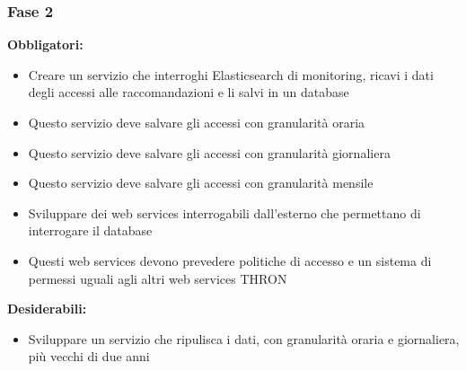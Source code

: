 \documentclass[a4paper, 12pt, twoside, openright]{book}
\begin{document}
\subsubsection{Fase 2}
\textbf{Obbligatori:}
\begin{itemize}
\item Creare un servizio che interroghi Elasticsearch di monitoring, ricavi i dati degli accessi alle raccomandazioni e li salvi in un database
\item Questo servizio deve salvare gli accessi con granularità oraria
\item Questo servizio deve salvare gli accessi con granularità giornaliera
\item Questo servizio deve salvare gli accessi con granularità mensile
\item Sviluppare dei web services interrogabili dall'esterno che permettano di interrogare il database
\item Questi web services devono prevedere politiche di accesso e un sistema di permessi uguali agli altri web services THRON
\end{itemize}
\textbf{Desiderabili:}
\begin{itemize}
\item Sviluppare un servizio che ripulisca i dati, con granularità oraria e giornaliera, più vecchi di due anni
\end{itemize}
\end{document}
